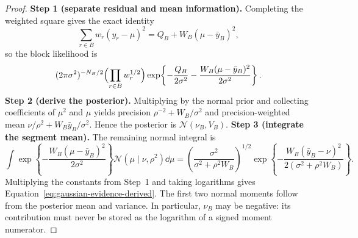\begin{proof}
\textbf{Step 1 (separate residual and mean information).}
Completing the weighted square gives the exact identity
\[
\sum_{r\in B}w_r(y_r-\mu)^2
=Q_B+W_B(\mu-\bar y_B)^2,
\]
so the block likelihood is
\[
(2\pi\sigma^2)^{-N_B/2}\Bigl(\prod_{r\in B}w_r^{1/2}\Bigr)
\exp\!\left\{-\frac{Q_B}{2\sigma^2}
-\frac{W_B(\mu-\bar y_B)^2}{2\sigma^2}\right\}.
\]
\textbf{Step 2 (derive the posterior).}
Multiplying by the normal prior and collecting coefficients of $\mu^2$ and $\mu$ yields precision $\rho^{-2}+W_B/\sigma^2$ and precision-weighted mean $\nu/\rho^2+W_B\bar y_B/\sigma^2$. Hence the posterior is $\mathcal N(\nu_B,V_B)$.
\textbf{Step 3 (integrate the segment mean).}
The remaining normal integral is
\[
\int\!\exp\!\left\{-\frac{W_B(\mu-\bar y_B)^2}{2\sigma^2}\right\}
\mathcal N(\mu\mid\nu,\rho^2)\dd\mu
=\left(\frac{\sigma^2}{\sigma^2+\rho^2W_B}\right)^{1/2}
\exp\!\left\{-\frac{W_B(\bar y_B-\nu)^2}{2(\sigma^2+\rho^2W_B)}\right\}.
\]
Multiplying the constants from Step~1 and taking logarithms gives Equation~\eqref{eq:gaussian-evidence-derived}. The first two normal moments follow from the posterior mean and variance. In particular, $\nu_B$ may be negative: its contribution must never be stored as the logarithm of a signed moment numerator.
\end{proof}

